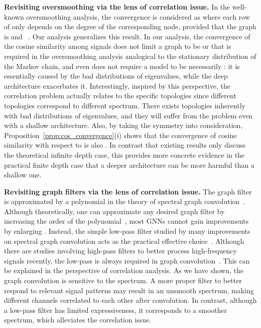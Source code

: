 \documentclass[nohyperref]{article}
\theoremstyle{plain}
\theoremstyle{definition}
\theoremstyle{remark}
\begin{document}
\textbf{Revisiting oversmoothing via the lens of correlation issue.}
In the well-known oversmoothing analysis, the convergence is considered as  where each row of  only depends on the
degree of the corresponding node, provided that the graph is  and ~\cite{xu2018representation,liu2020towards,zhao2020pairnorm,chien2021adaptive}.
Our analysis generalizes this result.
In our analysis, the convergence of the cosine similarity among signals does not limit a graph to be  or  that is required in the oversmoothing analysis analogical to the stationary distribution of the Markov chain, and even does not require a model to be necessarily  :
it is essentially caused by the bad distributions of eigenvalues, while the deep architecture exacerbates it.
Interestingly, inspired by this perspective, the correlation problem actually relates to the specific topologies since different topologies correspond to different spectrum.
There exists topologies inherently with bad distributions of eigenvalues, and they will suffer from the problem even with a shallow architecture.
Also, by taking the symmetry into consideration, Proposition~\ref{prop:cos_convergence}(i) shows that the convergence of cosine similarity with respect to  is also .
In contrast that existing results only discuss the theoretical infinite depth case, this provides more concrete evidence in the practical finite depth case that a deeper architecture can be more harmful than a shallow one.

\textbf{Revisiting graph filters via the lens of correlation issue.}
The graph filter is approximated by a polynomial in the theory of spectral graph convolution~\cite{hammond2011wavelets,defferrard2016convolutional}. Although theoretically, one can approximate any desired graph filter by increasing the order  of the polynomial~\cite{shuman2013emerging}, most GNNs cannot gain improvements by enlarging . Instead, the simple low-pass filter studied by many improvements on spectral graph convolution acts as the practical effective choice~\cite{shuman2013emerging,pmlr-v97-wu19e,1905.09550,muhammet2020spectral,klicpera2019diffusion}. Although there are studies involving high-pass filters to better process high-frequency signals recently, the low-pass is always required in graph convolution~\cite{zhu2020simple,zhu2021interpreting,balcilar2021analyzing,fagcn2021,gao2021message}. This can be explained in the perspective of correlation analysis. As we have shown, the graph convolution is sensitive to the spectrum. A more proper filter to better respond to relevant signal patterns may result in an unsmooth spectrum, making different channels correlated to each other after convolution. In contrast, although a low-pass filter has limited expressiveness, it corresponds to a smoother spectrum, which alleviates the correlation issue.
\end{document}
